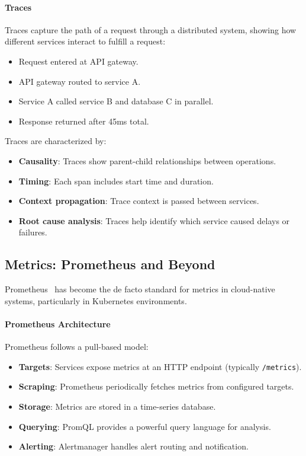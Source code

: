 \documentclass[a4paper,twoside]{sapthesis}
\begin{document}
\paragraph{Traces}

Traces capture the path of a request through a distributed system, showing how different services interact to fulfill a request:

\begin{itemize}
    \item Request entered at API gateway.
    \item API gateway routed to service A.
    \item Service A called service B and database C in parallel.
    \item Response returned after 45ms total.
\end{itemize}

Traces are characterized by:
\begin{itemize}
    \item \textbf{Causality}: Traces show parent-child relationships between operations.
    \item \textbf{Timing}: Each span includes start time and duration.
    \item \textbf{Context propagation}: Trace context is passed between services.
    \item \textbf{Root cause analysis}: Traces help identify which service caused delays or failures.
\end{itemize}

\subsection{Metrics: Prometheus and Beyond}

Prometheus~\cite{prometheus2023}
has become the de facto standard for metrics in cloud-native systems, particularly in Kubernetes environments.

\paragraph{Prometheus Architecture}

Prometheus follows a pull-based model:
\begin{itemize}
    \item \textbf{Targets}: Services expose metrics at an HTTP endpoint (typically \texttt{/metrics}).
    \item \textbf{Scraping}: Prometheus periodically fetches metrics from configured targets.
    \item \textbf{Storage}: Metrics are stored in a time-series database.
    \item \textbf{Querying}: PromQL provides a powerful query language for analysis.
    \item \textbf{Alerting}: Alertmanager handles alert routing and notification.
\end{itemize}
\end{document}
